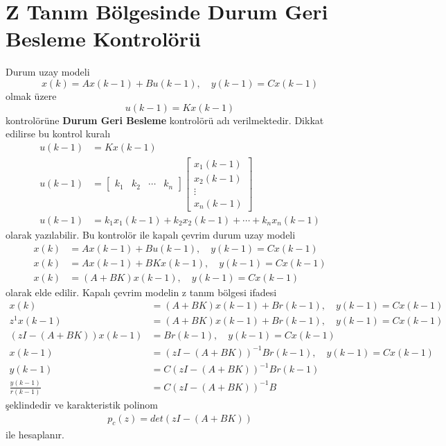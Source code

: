 \chapter{Z Tanım Bölgesinde Durum Geri Besleme Kontrolörü}
Durum uzay modeli
\begin{equation}
    x(k)=A x(k-1)+Bu(k-1),\quad y(k-1)=C x(k-1)
\end{equation}
olmak üzere 
\begin{equation}
    u(k-1)=K x(k-1)
\end{equation}
kontrolörüne \textbf{Durum Geri Besleme} kontrolörü adı verilmektedir. Dikkat edilirse bu kontrol kuralı
\begin{equation}
\begin{split}
    u(k-1)&=K x(k-1)\\
    u(k-1)&=\begin{bmatrix}k_1& k_2& \cdots& k_n\end{bmatrix} \begin{bmatrix}x_1(k-1)\\x_2(k-1)\\\vdots\\x_n(k-1)\end{bmatrix}\\
    u(k-1)&=k_1x_1(k-1)+k_2x_2(k-1)+\cdots+k_nx_n(k-1)
\end{split}
\end{equation}
olarak yazılabilir. Bu kontrolör ile kapalı çevrim durum uzay modeli
\begin{equation}
    \begin{split}
        x(k)&=A x(k-1)+Bu(k-1),\quad y(k-1)=C x(k-1)\\
        x(k)&=A x(k-1)+BKx(k-1),\quad y(k-1)=C x(k-1)\\
        x(k)&=(A+BK) x(k-1),\quad y(k-1)=C x(k-1)
    \end{split}
\end{equation}
olarak elde edilir. Kapalı çevrim modelin z tanım bölgesi ifadesi
\begin{equation}
    \begin{split}
        x(k)&=(A+BK) x(k-1)+B r(k-1),\quad y(k-1)=C x(k-1)\\
        z^1 x(k-1)&=(A+BK) x(k-1)+B r(k-1),\quad y(k-1)=C x(k-1)\\
        (zI-(A+BK)) x(k-1)&=B r(k-1),\quad y(k-1)=C x(k-1)\\
        x(k-1)&=(zI-(A+BK))^{-1} B r(k-1),\quad y(k-1)=C x(k-1)\\
        y(k-1)&=C(zI-(A+BK))^{-1}B r(k-1)\\
        \frac{y(k-1)}{r(k-1)}&=C(zI-(A+BK))^{-1}B
    \end{split}
\end{equation}
şeklindedir ve karakteristik polinom
\begin{equation}
    \begin{split}
        p_c(z)=det(zI-(A+BK))
    \end{split}
\end{equation}
ile hesaplanır.

